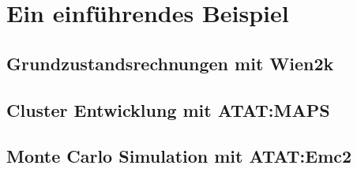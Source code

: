 \chapter{Ein einführendes Beispiel}
\section{Grundzustandsrechnungen mit Wien2k}
\section{Cluster Entwicklung mit ATAT:MAPS}
\section{Monte Carlo Simulation mit ATAT:Emc2}